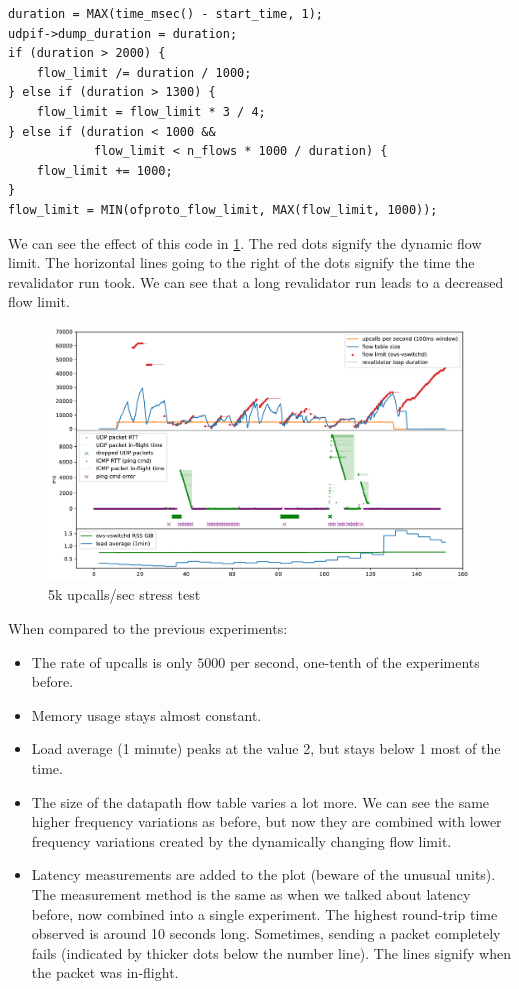 \begin{verbatim}
duration = MAX(time_msec() - start_time, 1);
udpif->dump_duration = duration;
if (duration > 2000) {
    flow_limit /= duration / 1000;
} else if (duration > 1300) {
    flow_limit = flow_limit * 3 / 4;
} else if (duration < 1000 &&
            flow_limit < n_flows * 1000 / duration) {
    flow_limit += 1000;
}
flow_limit = MIN(ofproto_flow_limit, MAX(flow_limit, 1000));
\end{verbatim}

We can see the effect of this code in \cref{fig:packet-flood-limited}. The red dots signify the dynamic flow limit. The horizontal lines going to the right of the dots signify the time the revalidator run took. We can see that a long revalidator run leads to a decreased flow limit.

\begin{figure}
    \centering
    \includegraphics[width=.9\linewidth]{img/packet_flood_limited_resources_50k.pdf}
    \caption{5k upcalls/sec stress test}
    \label{fig:packet-flood-limited}
\end{figure}

 When compared to the previous experiments:

\begin{itemize}
    \item The rate of upcalls is only $5000$ per second, one-tenth of the experiments before.
    \item Memory usage stays almost constant.
    \item Load average (1 minute) peaks at the value 2, but stays below 1 most of the time.
    \item The size of the datapath flow table varies a lot more. We can see the same higher frequency variations as before, but now they are combined with lower frequency variations created by the dynamically changing flow limit.
    \item Latency measurements are added to the plot (beware of the unusual units). The measurement method is the same as when we talked about latency before, now combined into a single experiment. The highest round-trip time observed is around 10 seconds long. Sometimes, sending a packet completely fails (indicated by thicker dots below the number line). The lines signify when the packet was in-flight.
\end{itemize}

